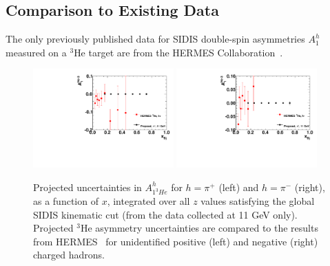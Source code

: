 
\subsection{Comparison to Existing Data}
The only previously published data for SIDIS double-spin asymmetries $A_{1}^h$ measured on a $^3$He target are from the HERMES Collaboration~\cite{Ackerstaff:1999ey}. 
\begin{figure}[h]
  \begin{center}
    \includegraphics[width=0.48\textwidth]{figures/A1He3hplus_HERMES_compare.pdf}
    \includegraphics[width=0.48\textwidth]{figures/A1He3hminus_HERMES_compare.pdf}
  \end{center}
  \caption{\label{fig:A1heliumHERMEScomparison} Projected uncertainties in $A^{h}_{1^3He}$ for $h = \pi^+$ (left) and $h = \pi^-$ (right), as a function of $x$, integrated over all $z$ values satisfying the global SIDIS kinematic cut (from the data collected at 11 GeV only). Projected $^3$He asymmetry uncertainties are compared to the results from HERMES~\cite{Ackerstaff:1999ey} for unidentified positive (left) and negative (right) charged hadrons. }
\end{figure}
